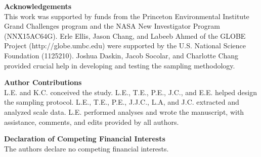 \documentclass[12pt]{article}
\begin{document}
\vspace{10pt}
\noindent \textbf{Acknowledgements} 
\vspace{5pt}
\\
This work was supported by funds from the Princeton Environmental Institute Grand Challenges program and the NASA New Investigator Program (NNX15AC64G). Erle Ellis, Jason Chang, and Labeeb Ahmed of the GLOBE Project (http://globe.umbc.edu) were supported by the U.S. National Science Foundation (1125210). Joshua Daskin, Jacob Socolar, and Charlotte Chang provided crucial help in developing and testing the sampling methodology. 

\vspace{10pt}
\noindent \textbf{Author Contributions} 
\vspace{5pt}
\\
L.E. and K.C. conceived the study. L.E., T.E., P.E., J.C., and E.E. helped design the sampling protocol. L.E., T.E., P.E., J.J.C., L.A, and J.C. extracted and analyzed scale data. L.E. performed analyses and wrote the manuscript, with assistance, comments, and edits provided by all authors. 

\vspace{10pt}
\noindent \textbf{Declaration of Competing Financial Interests} 
\vspace{5pt}
\\
The authors declare no competing financial interests. 






\clearpage
\end{document}
